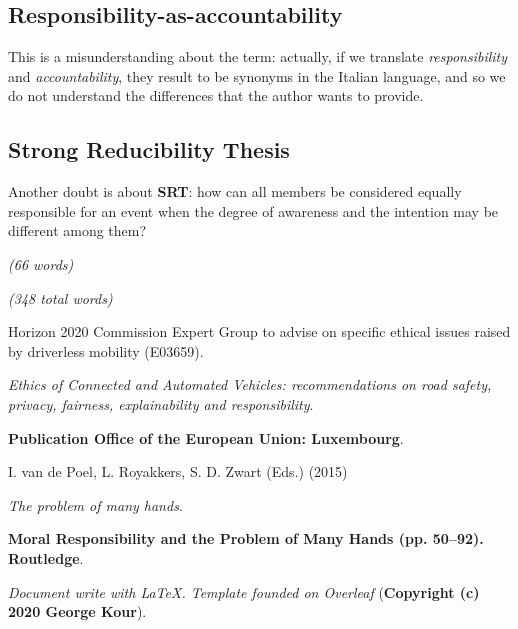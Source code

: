 \subsection{Responsibility-as-accountability} This is a misunderstanding about the term: actually, if we translate \textit{responsibility} and \textit{accountability}, they result to be synonyms in the Italian language, and so we do not understand the differences that the author wants to provide.

\subsection{Strong Reducibility Thesis}
Another doubt is about \textbf{SRT}: how can all members be considered equally responsible for an event when the degree of awareness and the intention may be different among them?

\emph{(66 words)}

\emph{(348 total words)}

\newpage
\begin{thebibliography}{99}


Horizon 2020 Commission Expert Group to advise on specific ethical issues raised by driverless mobility (E03659).

\textit{Ethics of Connected and Automated Vehicles: recommendations on road safety, privacy, fairness, explainability and responsibility}.

\textbf{Publication Office of the European Union: Luxembourg}.


I. van de Poel, L. Royakkers, S. D. Zwart (Eds.) (2015)

\textit{The problem of many hands}.

\textbf{Moral Responsibility and the Problem of Many Hands (pp. 50–92). Routledge}.

\end{thebibliography}

\textit{Document write with \LaTeX. Template founded on Overleaf} (\textbf{Copyright (c) 2020 George Kour}).